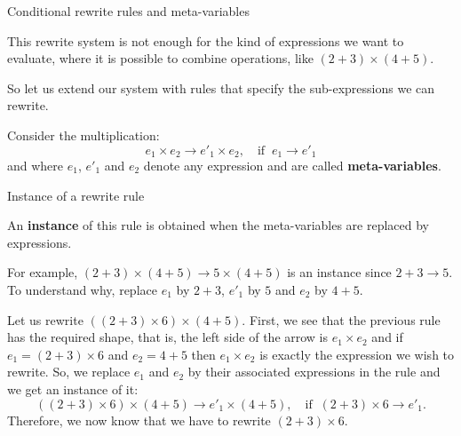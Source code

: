 %
\begin{frame}{Conditional rewrite rules and meta-variables}

  This rewrite system is not enough for the kind of expressions we
  want to evaluate, where it is possible to combine operations, like
  \((2+3) \times (4+5)\).

  \bigskip

  So let us extend our system with rules that specify the
  sub-expressions we can rewrite.

  \bigskip

  Consider the multiplication:
  \begin{equation*}
    e_1 \times e_2 \rightarrow e'_1 \times e_2, \quad \text{if} \;\; e_1
    \rightarrow e'_1
  \end{equation*}
  and where \(e_1\), \(e'_1\) and \(e_2\) denote any expression and
  are called \textbf{meta\hyp{}variables}.

\end{frame}

%
\begin{frame}{Instance of a rewrite rule}

  An \textbf{instance} of this rule is obtained when the
  meta-variables are replaced by expressions.

  \bigskip

  For example, \( (2+3) \times (4+5) \rightarrow 5 \times (4+5) \) is
  an instance since \(2 + 3 \rightarrow 5\). To understand why,
  replace \(e_1\) by \(2+3\), \(e'_1\) by \(5\) and \(e_2\) by
  \(4+5\).

  \bigskip

  Let us rewrite \(((2 + 3) \times 6) \times (4+5)\). First, we see
  that the previous rule has the required shape, that is, the left
  side of the arrow is \(e_1 \times e_2\) and if \(e_1 = (2+3) \times
  6\) and \(e_2 = 4+5\) then \(e_1 \times e_2\) is exactly the
  expression we wish to rewrite. So, we replace \(e_1\) and \(e_2\) by
  their associated expressions in the rule and we get an instance of
  it:
  \begin{equation*}
    ((2 + 3) \times 6) \times (4+5) \rightarrow e'_1 \times (4+5),
    \quad \text{if} \;\; (2+3) \times 6 \rightarrow e'_1.
  \end{equation*}
  Therefore, we now know that we have to rewrite \((2 + 3) \times 6\).

\end{frame}

